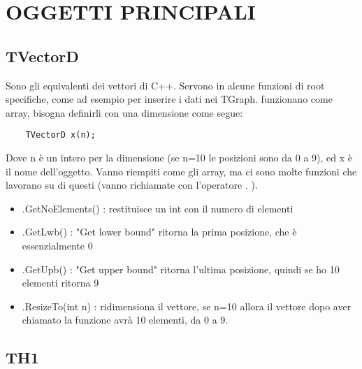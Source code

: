 \chapter{OGGETTI PRINCIPALI}
\section{TVectorD}
Sono gli equivalenti dei vettori di C++. Servono in alcune funzioni di root specifiche, come ad esempio per inserire i dati nei TGraph. funzionano come array, bisogna definirli con una dimensione come segue:
\begin{lstlisting}
	TVectorD x(n);
\end{lstlisting}
Dove n è un intero per la dimensione (se n=10 le posizioni sono da 0 a 9), ed x è il nome dell'oggetto. Vanno riempiti come gli array, ma ci sono molte funzioni che lavorano su di questi (vanno richiamate con l'operatore . ).
\begin{itemize}
	\item .GetNoElements() : restituisce un int con il numero di elementi
	\item .GetLwb() : "Get lower bound" ritorna la prima posizione, che è essenzialmente 0
	\item .GetUpb() : "Get upper bound" ritorna l'ultima posizione, quindi se ho 10 elementi ritorna 9
	\item .ResizeTo(int n) : ridimensiona il vettore, se n=10 allora il vettore dopo aver chiamato la funzione avrà 10 elementi, da 0 a 9.
\end{itemize}

\section{TH1}

